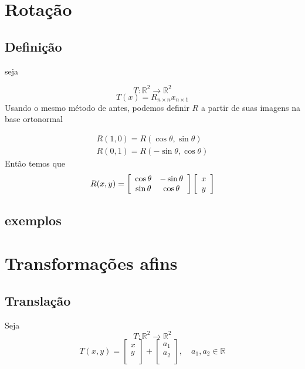 \section{Rotação}
\subsection{Definição}
seja

\[
    T: \mathbb{R}^2 \longrightarrow \mathbb{R}^2
\]
\[
    T(x) = R_{n \times n}x_{n \times 1}
\]
Usando o mesmo método de antes, podemos definir \(R\) a partir de suas imagens na base ortonormal

\begin{gather*}
    R(1,0) = R(\cos{\theta}, \sin{\theta})\\
    R(0,1) = R( - \sin{\theta}, \cos{\theta})
\end{gather*}
Então temos que
\begin{equation}
    R(x, y) = 
    \left[ 
    {
        \begin{array}{c c}
            \cos{\theta} & -\sin{\theta} \\
            \sin{\theta} &  \cos{\theta} \\
        \end{array} 
    } 
    \right]
    \left[ 
    {
        \begin{array}{c}
            x \\
            y \\
        \end{array} 
        } 
    \right]
\end{equation}

\subsection{exemplos}

\section{Transformações afins}

\subsection{Translação}
Seja
\[
    T: \mathbb{R}^2 \longrightarrow \mathbb{R}^2
\]
\begin{equation}
    T(x, y) = 
    \left[ 
    {
        \begin{array}{c}
            x \\
            y \\
        \end{array} 
        } 
    \right]
    +
    \left[ 
    {
        \begin{array}{c}
            a_1 \\ 
            a_2 \\
        \end{array} 
    } 
    \right]
    ,\quad a_1, a_2 \in \mathbb{R}
\end{equation}

